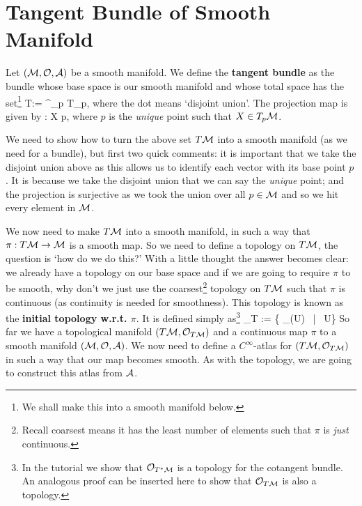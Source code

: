 \pagebreak 

\section{Tangent Bundle of Smooth Manifold}

Let $(\mathcal{M},\mathcal{O},\mathcal{A})$ be a smooth manifold. We define the \textbf{tangent bundle} as the bundle whose base space is our smooth manifold and whose total space has the set\footnote{We shall make this into a smooth manifold below.} 
\bse 
    T\cM := \bigcup^{\bullet}_{p\in\cM} T_p\cM,
\ese 
where the dot means `disjoint union'. The projection map is given by
\bse 
    \pi : X \mapsto p,
\ese
where $p$ is the \textit{unique} point such that $X\in T_p\mathcal{M}$.

We need to show how to turn the above set $T\mathcal{M}$ into a smooth manifold (as we need for a bundle), but first two quick comments: it is important that we take the disjoint union above as this allows us to identify each vector with its base point $p$. It is because we take the disjoint union that we can say the \textit{unique} point; and the projection is surjective as we took the union over all $p\in\mathcal{M}$ and so we hit every element in $\mathcal{M}$. 

We now need to make $T\mathcal{M}$ into a smooth manifold, in such a way that $\pi:T\mathcal{M} \to \mathcal{M}$ is a smooth map. So we need to define a topology on $T\mathcal{M}$, the question is `how do we do this?' With a little thought the answer becomes clear: we already have a topology on our base space and if we are going to require $\pi$ to be smooth, why don't we just use the coarsest\footnote{Recall coarsest means it has the least number of elements such that $\pi$ is \textit{just} continuous.} topology on $T\mathcal{M}$ such that $\pi$ is continuous (as continuity is needed for smoothness). This topology is known as the \textbf{initial topology w.r.t. $\pi$}. It is defined simply as\footnote{In the tutorial we show that $\mathcal{O}_{T^*\mathcal{M}}$ is a topology for the cotangent bundle. An analogous proof can be inserted here to show that $\mathcal{O}_{T\mathcal{M}}$ is also a topology.} 
\bse 
    \cO_{T\cM} := \{ \preim_{\pi}(U) \, | \, U\in\cO\}
\ese
So far we have a topological manifold $(T\mathcal{M},\mathcal{O}_{T\mathcal{M}})$ and a continuous map $\pi$ to a smooth manifold $(\mathcal{M},\mathcal{O},\mathcal{A})$. We now need to define a $C^{\infty}$-atlas for $(T\mathcal{M},\mathcal{O}_{T\mathcal{M}})$ in such a way that our map becomes smooth. As with the topology, we are going to construct this atlas from $\mathcal{A}$. 

